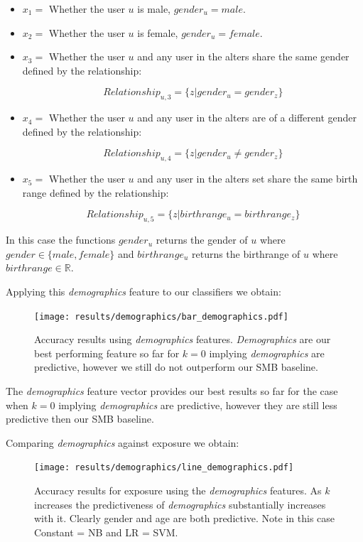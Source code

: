 \begin{itemize}
\item $x_1 = $ Whether the user $u$ is male, $gender_u = male$.
\item $x_2 = $ Whether the user $u$ is female, $gender_u = female$.
\item $x_3 = $ Whether the user $u$ and any user in the alters share the same gender defined by the relationship:

\[ Relationship_{u,3} = \{z | gender_u = gender_z\} \]

\item $x_4 = $ Whether the user $u$ and any user in the alters are of a different gender defined by the relationship:

\[ Relationship_{u,4} = \{z | gender_u \neq gender_z\} \]

\item $x_5 = $ Whether the user $u$ and any user in the alters set share the same birth range defined by the relationship:

\[ Relationship_{u,5} = \{z | birthrange_u = birthrange_z\} \]

\end{itemize}

In this case the functions $gender_{u}$ returns the gender of $u$ where $gender \in \{male, female\}$ and $birthrange_u$ returns 
the birthrange of $u$ where $birthrange \in \mathbb{R}$.

Applying this \emph{demographics} feature to our classifiers we obtain:

\begin{figure}[h]
	\begin{center}
		\texttt{[image: results/demographics/bar\_demographics.pdf]}
		\caption{Accuracy results using \emph{demographics} features. \emph{Demographics} are our best performing feature so far for $k=0$ implying \emph{demographics} are predictive, 
				 however we still do not outperform our SMB baseline.}
	\end{center}
\end{figure}

The \emph{demographics} feature vector provides our best results so far for the case when $k=0$ implying \emph{demographics} are predictive, however they are still less predictive then 
our SMB baseline.

\clearpage
	
Comparing \emph{demographics} against exposure we obtain:
	
\begin{figure}[h]
	\begin{center}
		\texttt{[image: results/demographics/line\_demographics.pdf]}
		\caption{Accuracy results for exposure using the \emph{demographics} features. As $k$ increases the predictiveness of \emph{demographics} substantially 
				 increases with it. Clearly gender and age are both predictive. Note in this case Constant = NB and LR = SVM.}
	\end{center}
\end{figure}

